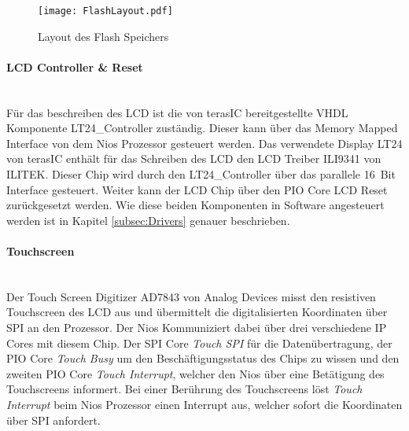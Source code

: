 \begin{figure}[h!]
	\centering
	\texttt{[image: FlashLayout.pdf]}
	\caption{Layout des Flash Speichers} 
	\label{img:FlashLayout}
\end{figure}  

\paragraph{LCD Controller \& Reset}\mbox{}\\

Für das beschreiben des LCD ist die von terasIC bereitgestellte VHDL Komponente LT24\_Controller zuständig. Dieser kann über das Memory Mapped Interface von dem Nios Prozessor gesteuert werden. Das verwendete Display LT24 von terasIC enthält für das Schreiben des LCD den LCD Treiber ILI9341 von ILITEK. Dieser Chip wird durch den LT24\_Controller über das parallele \SI{16}{Bit} Interface gesteuert. Weiter kann der LCD Chip über den PIO Core LCD Reset zurückgesetzt werden. Wie diese beiden Komponenten in Software angesteuert werden ist in Kapitel \ref{subsec:Drivers} genauer beschrieben. \cite{LCD_Chip}

\paragraph{Touchscreen}\mbox{}\\
Der Touch Screen Digitizer AD7843 von Analog Devices misst den resistiven Touchscreen des LCD aus und übermittelt die digitalisierten Koordinaten über SPI an den Prozessor. Der Nios Kommuniziert dabei über drei verschiedene IP Cores mit diesem Chip. Der SPI Core \textit{Touch SPI} für die Datenübertragung, der PIO Core \textit{Touch Busy} um den Beschäftigungsstatus des Chips zu wissen und den zweiten PIO Core \textit{Touch Interrupt}, welcher den Nios über eine Betätigung des Touchscreens informert. Bei einer Berührung des Touchscreens löst \textit{Touch Interrupt} beim Nios Prozessor einen Interrupt aus, welcher sofort die Koordinaten über SPI anfordert. \cite{Touch_ADC}